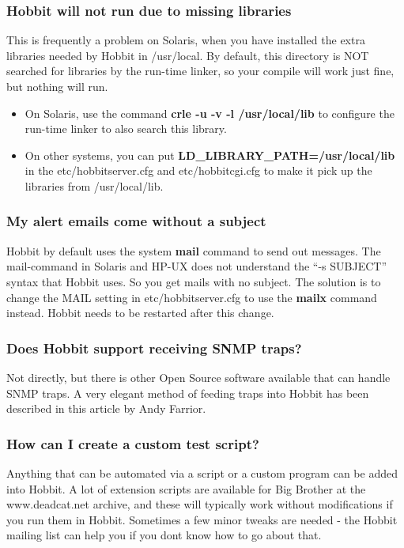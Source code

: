 \subsubsection*{Hobbit will not run due to missing libraries}


 This is frequently a problem on Solaris, when you have installed the extra libraries needed by Hobbit in /usr/local. By default, this directory is NOT searched for libraries by the run-time linker, so your compile will work just fine, but nothing will run. \begin{itemize}
\item On Solaris, use the command \textbf{crle -u -v -l /usr/local/lib}
 to configure the run-time linker to also search this library.
\item On other systems, you can put \textbf{LD\_LIBRARY\_PATH=/usr/local/lib}
 in the etc/hobbitserver.cfg and etc/hobbitcgi.cfg to make it pick up the libraries from /usr/local/lib.

\end{itemize}

\hline 
\subsubsection*{My alert emails come without a subject}


 Hobbit by default uses the system \textbf{mail}
 command to send out messages. The mail-command in Solaris and HP-UX does not understand the ``-s SUBJECT'' syntax that Hobbit uses. So you get mails with no subject. The solution is to change the MAIL setting in etc/hobbitserver.cfg to use the \textbf{mailx}
 command instead. Hobbit needs to be restarted after this change.
\hline 
\subsubsection*{Does Hobbit support receiving SNMP traps?}


 Not directly, but there is other Open Source software available that can handle SNMP traps. A very elegant method of feeding traps into Hobbit has been described in this article by Andy Farrior.
\hline 
\subsubsection*{How can I create a custom test script?}


 Anything that can be automated via a script or a custom program can be added into Hobbit. A lot of extension scripts are available for Big Brother at the www.deadcat.net archive, and these will typically work without modifications if you run them in Hobbit. Sometimes a few minor tweaks are needed - the Hobbit mailing list can help you if you dont know how to go about that.


